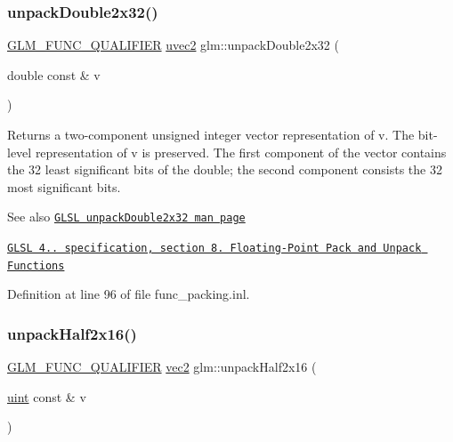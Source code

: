 \subsubsection{\texorpdfstring{unpack\+Double2x32()}{unpackDouble2x32()}}
{\footnotesize\ttfamily \hyperlink{setup_8hpp_a33fdea6f91c5f834105f7415e2a64407}{G\+L\+M\+\_\+\+F\+U\+N\+C\+\_\+\+Q\+U\+A\+L\+I\+F\+I\+ER} \hyperlink{group__core__types_gafd2041b45eff671aa8899d2c2835eee9}{uvec2} glm\+::unpack\+Double2x32 (\begin{DoxyParamCaption}\item[{double const \&}]{v }\end{DoxyParamCaption})}

Returns a two-\/component unsigned integer vector representation of v. The bit-\/level representation of v is preserved. The first component of the vector contains the 32 least significant bits of the double; the second component consists the 32 most significant bits.

\begin{DoxySeeAlso}{See also}
\href{http://www.opengl.org/sdk/docs/manglsl/xhtml/unpackDouble2x32.xml}{\tt G\+L\+SL unpack\+Double2x32 man page} 

\href{http://www.opengl.org/registry/doc/GLSLangSpec.4.20.8.pdf}{\tt G\+L\+SL 4.. specification, section 8. Floating-\/\+Point Pack and Unpack Functions} 
\end{DoxySeeAlso}


Definition at line 96 of file func\+\_\+packing.\+inl.

\mbox{\label{group__core__func__packing_ga4051804cc2c930ba4ca73382b79edf1d}} 
\subsubsection{\texorpdfstring{unpack\+Half2x16()}{unpackHalf2x16()}}
{\footnotesize\ttfamily \hyperlink{setup_8hpp_a33fdea6f91c5f834105f7415e2a64407}{G\+L\+M\+\_\+\+F\+U\+N\+C\+\_\+\+Q\+U\+A\+L\+I\+F\+I\+ER} \hyperlink{group__core__types_gaa1618f51db67eaa145db101d8c8431d8}{vec2} glm\+::unpack\+Half2x16 (\begin{DoxyParamCaption}\item[{\hyperlink{group__core__precision_ga4fd29415871152bfb5abd588334147c8}{uint} const \&}]{v }\end{DoxyParamCaption})}

